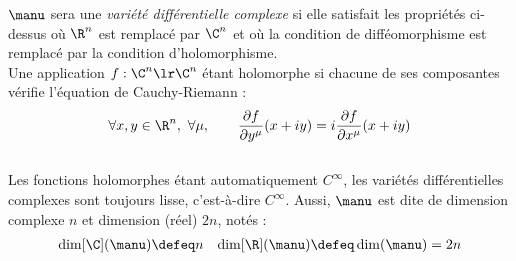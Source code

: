 $\manu$ sera une \emph{variété différentielle complexe} si elle satisfait les propriétés ci-dessus où $\R^n$ est remplacé par $\C^n$ et où la condition de difféomorphisme est remplacé par la condition d'holomorphisme. 
\\
Une application $f : \C^n\lr \C^n$ étant holomorphe si chacune de ses composantes vérifie l'équation de Cauchy-Riemann :
\[\forall x,y\in\R^n,\ \forall \mu,\qquad \frac{\partial f }{\partial y^\mu}(x+iy) = i \frac{\partial f }{\partial x^\mu}(x+iy)\]
\\
Les fonctions holomorphes étant automatiquement $C^\infty$, les variétés différentielles complexes sont toujours lisse, c'est-à-dire $C^\infty$. Aussi, $\manu$ est dite de dimension complexe $n$ et dimension (réel) $2n$, notés :
\begin{align}\label{eq:manuC-base_cano}
	\dim[\C](\manu) &\defeq n  &  \dim[\R] (\manu) \defeq \dim (\manu) = 2n
\end{align}
\\

